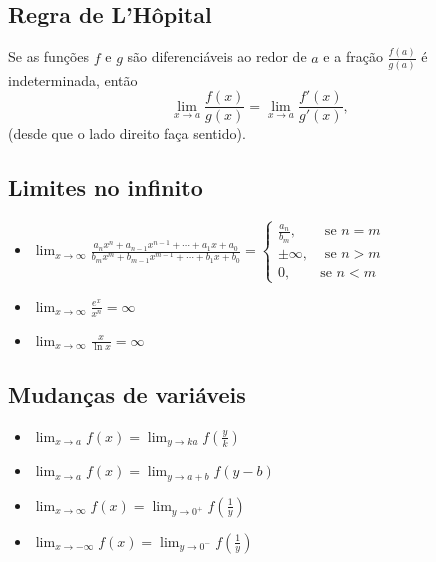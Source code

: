 \subsection*{Regra de L'Hôpital}

Se as funções $f$ e $g$ são diferenciáveis ao redor de $a$ e a fração $\frac{f(a)}{g(a)}$ é indeterminada, então
\[\lim_{x\to a}\frac{f(x)}{g(x)}=\lim_{x\to a}\frac{f'(x)}{g'(x)},\]
(desde que o lado direito faça sentido).

\subsection*{Limites no infinito}

\begin{itemize}
\item $\lim_{x\to\infty}\frac{a_nx^n+a_{n-1}x^{n-1}+\cdots+a_1x+a_0}{b_mx^m+b_{m-1}x^{m-1}+\cdots+b_1x+b_0}=\begin{cases}\frac{a_n}{b_m},&\text{ se }n=m\\\pm\infty,&\text{ se }n>m\\0,&\text{se }n<m\end{cases}$
\item $\lim_{x\to\infty}\frac{e^x}{x^n}=\infty$
\item $\lim_{x\to\infty}\frac{x}{\ln x}=\infty$
\end{itemize}

\subsection*{Mudanças de variáveis}

\begin{itemize}
\item $\lim_{x\to a}f(x)=\lim_{y\to ka}f\left(\frac{y}{k}\right)$
\item $\lim_{x\to a}f(x)=\lim_{y\to a+b}f(y-b)$
\item $\lim_{x\to\infty}f(x)=\lim_{y\to 0^+}f\left(\frac{1}{y}\right)$
\item $\lim_{x\to-\infty}f(x)=\lim_{y\to 0^-}f\left(\frac{1}{y}\right)$
\end{itemize}